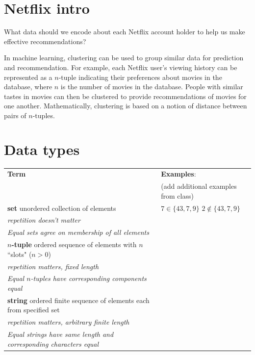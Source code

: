 \documentclass[12pt, oneside]{article}
\begin{document}
\begin{flushright}
\end{flushright} \section*{Netflix intro}


What data should we encode about each Netflix account holder to help us make effective recommendations?

\vfill
\vfill

In machine learning, clustering can be used to group similar data for prediction and recommendation.  For example,
each Netflix user's viewing history can be represented as a $n$-tuple indicating their preferences about
movies in the database, where $n$ is the number of movies in the database.  People with similar tastes in movies can then be clustered to provide recommendations
of movies for one another.  Mathematically, clustering is based on a notion of distance between pairs of $n$-tuples.
 \vfill
\section*{Data types}


\begin{center}
    \begin{tabular}{p{4.6in}p{2.6in}}
    {\bf  Term} & {\bf Examples}:\\
    &  (add additional examples from class)\\
    \hline 
    {\bf set} \newline
    unordered collection of elements & $7 \in \{43, 7, 9 \}$ \qquad $2 \notin \{43, 7, 9 \}$ \\
    {\it repetition doesn't matter} & \\
    {\it Equal sets agree on membership of all elements}& \\
    \hline
    {\bf $n$-tuple} \newline
    ordered sequence of elements with $n$ ``slots" ($n >0$) & \\
    {\it repetition matters, fixed length} &\\
    {\it Equal $n$-tuples have corresponding components equal}& \\
    \hline
    {\bf string} \newline
    ordered finite sequence of elements each from specified
    set & \\
    {\it repetition matters, arbitrary finite length} &\\
    {\it Equal strings have same length and corresponding characters equal}
    \end{tabular}
\end{center}
\end{document}
